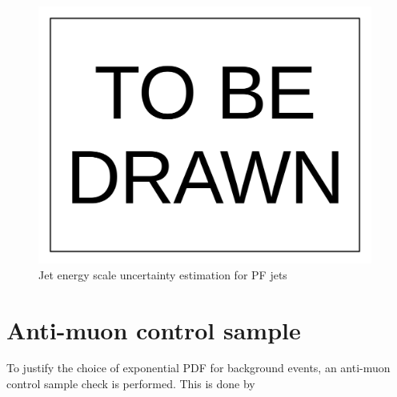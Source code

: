 \documentclass[10pt,a4paper,onecolumn]{	article}
\begin{document}
\begin{figure}
\includegraphics[width=110mm]{ToBeDrawn.pdf}
\caption{Jet energy scale uncertainty estimation for PF jets}
\label{Figure_PFJetJES}
\end{figure}


\section{Anti-muon control sample}

To justify the choice of exponential PDF for background events, an anti-muon control sample check is performed.
This is done by 
\end{document}

